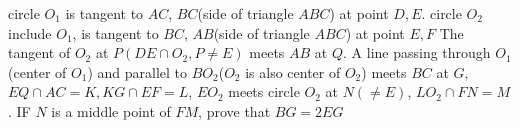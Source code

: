 circle $O_1$ is tangent to $AC$, $BC$(side of triangle $ABC$) at point $D, E$.
circle $O_2$ include $O_1$, is tangent to $BC$, $AB$(side of triangle $ABC$) at point $E, F$
The tangent of $O_2$ at $P(DE \cap O_2, P \neq E)$ meets $AB$ at $Q$.
A line passing through $O_1$(center of $O_1$) and parallel to $BO_2$($O_2$ is also center of $O_2$) meets $BC$ at $G$, $EQ \cap AC=K, KG \cap EF=L$, $EO_2$ meets circle $O_2$ at $N(\neq E)$, $LO_2 \cap FN=M$.
IF $N$ is a middle point of $FM$, prove that $BG=2EG$